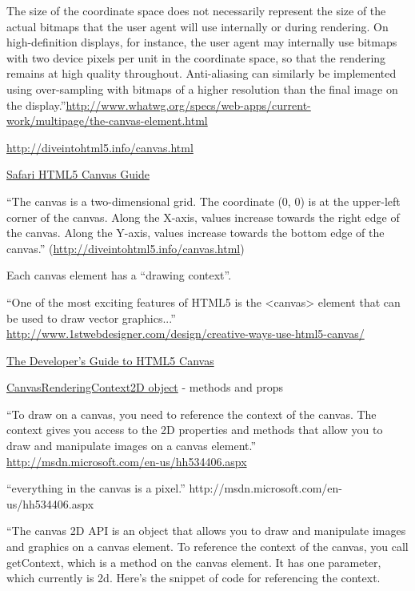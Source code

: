 \documentclass[reqno,12pt]{tufte-handout}
\numberwithin{equation}{subsection}
\numberwithin{equation}{subsection}
\begin{document}
\begin{appendices}
The size of the coordinate space does not necessarily represent the size of the actual bitmaps that the user agent will use internally or during rendering. On high-definition displays, for instance, the user agent may internally use bitmaps with two device pixels per unit in the coordinate space, so that the rendering remains at high quality throughout. Anti-aliasing can similarly be implemented using over-sampling with bitmaps of a higher resolution than the final image on the display.''\url{http://www.whatwg.org/specs/web-apps/current-work/multipage/the-canvas-element.html}

    \url{http://diveintohtml5.info/canvas.html}

    \href{https://developer.apple.com/library/safari/documentation/AudioVideo/Conceptual/HTML-canvas-guide/Introduction/Introduction.html#//apple_ref/doc/uid/TP40010542-CH1-SW1}{Safari HTML5 Canvas Guide}

    ``The canvas is a two-dimensional grid. The coordinate (0, 0) is at the upper-left corner of the canvas. Along the X-axis, values increase towards the right edge of the canvas. Along the Y-axis, values increase towards the bottom edge of the canvas.'' (\url{http://diveintohtml5.info/canvas.html})

    Each canvas element has a ``drawing context''.

    ``One of the most exciting features of HTML5 is the <canvas> element that can be used to draw vector graphics...'' \url{http://www.1stwebdesigner.com/design/creative-ways-use-html5-canvas/}


    \href{http://msdn.microsoft.com/en-us/hh534406.aspx}{The Developer’s Guide to HTML5 Canvas}

    \href{http://msdn.microsoft.com/en-us/library/ff975057.aspx}{CanvasRenderingContext2D object} - methods and props

    ``To draw on a canvas, you need to reference the context of the canvas.  The context gives you access to the 2D properties and methods that allow you to draw and manipulate images on a canvas element.'' \url{http://msdn.microsoft.com/en-us/hh534406.aspx}

    ``everything in the canvas is a pixel.'' http://msdn.microsoft.com/en-us/hh534406.aspx

    ``The canvas 2D API is an object that allows you to draw and
    manipulate images and graphics on a canvas element.  To reference the context of the canvas, you call getContext, which is a method on the canvas element.  It has one parameter, which currently is 2d.  Here’s the snippet of code for referencing the context.


\end{appendices}
\end{document}
